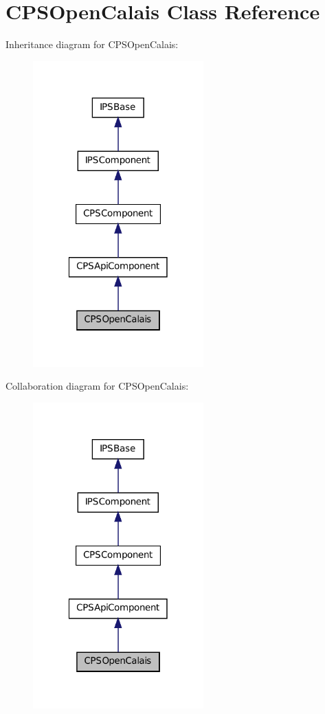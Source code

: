 \hypertarget{classCPSOpenCalais}{
\section{CPSOpenCalais Class Reference}
\label{classCPSOpenCalais}
}


Inheritance diagram for CPSOpenCalais:\nopagebreak
\begin{figure}[H]
\begin{center}
\leavevmode
\includegraphics[width=186pt]{classCPSOpenCalais__inherit__graph}
\end{center}
\end{figure}


Collaboration diagram for CPSOpenCalais:\nopagebreak
\begin{figure}[H]
\begin{center}
\leavevmode
\includegraphics[width=186pt]{classCPSOpenCalais__coll__graph}
\end{center}
\end{figure}
